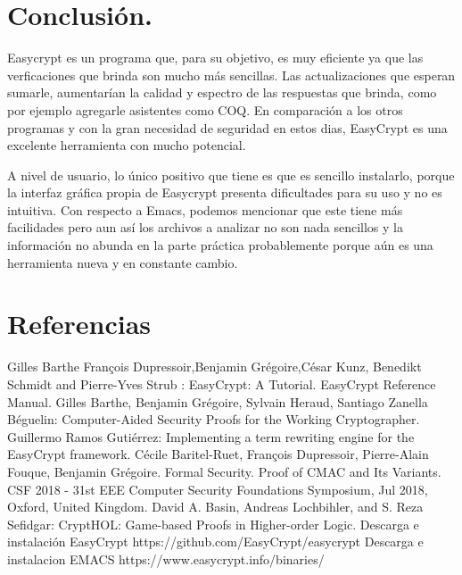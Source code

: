 \documentclass[runningheads,a4paper]{llncs}
\begin{document}
\section{Conclusión.}


Easycrypt es un programa que, para su objetivo, es muy eficiente ya que las verficaciones que brinda son mucho más sencillas. Las actualizaciones que esperan sumarle, aumentarían la calidad y espectro de las respuestas que brinda, como por ejemplo agregarle asistentes como COQ. En comparación a los otros programas y con la gran necesidad de seguridad en estos dias, EasyCrypt es una excelente herramienta con mucho potencial.

A nivel de usuario, lo único positivo que tiene es que es sencillo instalarlo, porque la interfaz gráfica propia de Easycrypt presenta dificultades para su uso y no es intuitiva. Con respecto a Emacs, podemos mencionar que este tiene más facilidades pero aun así los archivos a analizar no son nada sencillos y la información no abunda en la parte práctica probablemente porque aún es una herramienta nueva y en constante cambio.


\section{Referencias}

\begin{thebibliography}{1}
Gilles Barthe François Dupressoir,Benjamin Grégoire,César Kunz, Benedikt Schmidt and Pierre-Yves Strub : EasyCrypt: A Tutorial. 
EasyCrypt Reference Manual.
Gilles Barthe, Benjamin Grégoire, Sylvain Heraud, Santiago Zanella Béguelin: Computer-Aided Security Proofs
for the Working Cryptographer.
Guillermo Ramos Gutiérrez: Implementing a term rewriting
engine for the EasyCrypt framework.
Cécile Baritel-Ruet, François Dupressoir, Pierre-Alain Fouque, Benjamin Grégoire. Formal Security.
Proof of CMAC and Its Variants. CSF 2018 - 31st EEE Computer Security Foundations Symposium,
Jul 2018, Oxford, United Kingdom.
David A. Basin, Andreas Lochbihler, and S. Reza Sefidgar: CryptHOL: Game-based Proofs in
Higher-order Logic.
Descarga e instalación EasyCrypt https://github.com/EasyCrypt/easycrypt
Descarga e instalacion EMACS https://www.easycrypt.info/binaries/ 
\end{thebibliography}
\end{document}
